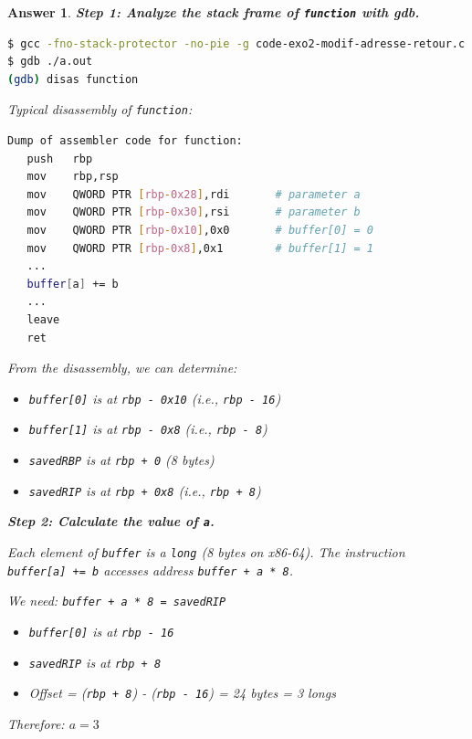 \documentclass[a4paper,11pt]{article}
\theoremstyle{plain}
\newtheorem{correction}{Answer}
\theoremstyle{definition}
\begin{document}
\begin{correction}

\textbf{Step 1: Analyze the stack frame of \texttt{function} with gdb.}

\begin{lstlisting}[language=bash,numbers=none]
$ gcc -fno-stack-protector -no-pie -g code-exo2-modif-adresse-retour.c
$ gdb ./a.out
(gdb) disas function
\end{lstlisting}

Typical disassembly of \texttt{function}:
\begin{lstlisting}[language=bash,numbers=none]
Dump of assembler code for function:
   push   rbp
   mov    rbp,rsp
   mov    QWORD PTR [rbp-0x28],rdi       # parameter a
   mov    QWORD PTR [rbp-0x30],rsi       # parameter b
   mov    QWORD PTR [rbp-0x10],0x0       # buffer[0] = 0
   mov    QWORD PTR [rbp-0x8],0x1        # buffer[1] = 1
   ...
   buffer[a] += b
   ...
   leave
   ret
\end{lstlisting}

From the disassembly, we can determine:
\begin{itemize}
\item \texttt{buffer[0]} is at \texttt{rbp - 0x10} (i.e., \texttt{rbp - 16})
\item \texttt{buffer[1]} is at \texttt{rbp - 0x8} (i.e., \texttt{rbp - 8})
\item \texttt{savedRBP} is at \texttt{rbp + 0} (8 bytes)
\item \texttt{savedRIP} is at \texttt{rbp + 0x8} (i.e., \texttt{rbp + 8})
\end{itemize}

\medskip
\textbf{Step 2: Calculate the value of \texttt{a}.}

Each element of \texttt{buffer} is a \texttt{long} (8 bytes on x86-64). The instruction \texttt{buffer[a] += b} accesses address \texttt{buffer + a * 8}.

We need: \texttt{buffer + a * 8 = savedRIP}

\begin{itemize}
\item \texttt{buffer[0]} is at \texttt{rbp - 16}
\item \texttt{savedRIP} is at \texttt{rbp + 8}
\item Offset = (\texttt{rbp + 8}) - (\texttt{rbp - 16}) = 24 bytes = 3 longs
\end{itemize}

Therefore: $\boxed{a = 3}$


\end{correction}
\end{document}
